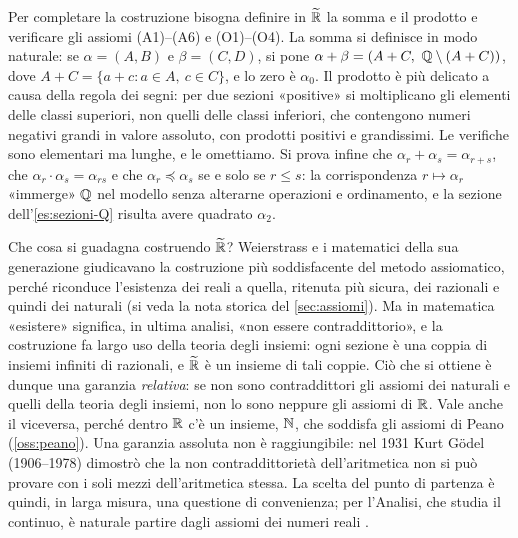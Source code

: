 \begin{osservazione}
Per completare la costruzione bisogna definire in $\widetilde{\mathbb{R}}$ la somma e il prodotto
e verificare gli assiomi (A1)--(A6) e (O1)--(O4). La somma si definisce in modo naturale:
se $\alpha=(A,B)$ e $\beta=(C,D)$, si pone $\alpha+\beta=(A+C,\ \Q\setminus(A+C))$, dove
$A+C=\{a+c : a\in A,\ c\in C\}$, e lo zero è $\alpha_{0}$. Il prodotto è più delicato a
causa della regola dei segni: per due sezioni «positive» si moltiplicano gli elementi
delle classi superiori, non quelli delle classi inferiori, che contengono numeri negativi
grandi in valore assoluto, con prodotti positivi e grandissimi. Le verifiche sono
elementari ma lunghe, e le omettiamo. Si prova infine che
$\alpha_{r}+\alpha_{s}=\alpha_{r+s}$, che $\alpha_{r}\cdot\alpha_{s}=\alpha_{rs}$ e che
$\alpha_{r}\preceq\alpha_{s}$ se e solo se $r\le s$: la corrispondenza $r\mapsto\alpha_{r}$
«immerge» $\mathbb{Q}$ nel modello senza alterarne operazioni e ordinamento, e la sezione
dell'\cref{es:sezioni-Q} risulta avere quadrato $\alpha_{2}$.
\end{osservazione}

\begin{osservazione}
Che cosa si guadagna costruendo $\widetilde{\mathbb{R}}$? Weierstrass e i matematici della sua
generazione giudicavano la costruzione più soddisfacente del metodo assiomatico, perché
riconduce l'esistenza dei reali a quella, ritenuta più sicura, dei razionali e quindi
dei naturali (si veda la nota storica del \cref{sec:assiomi}). Ma in matematica
«esistere» significa, in ultima analisi, «non essere contraddittorio», e la costruzione
fa largo uso della teoria degli insiemi: ogni sezione è una coppia di insiemi infiniti di
razionali, e $\widetilde{\mathbb{R}}$ è un insieme di tali coppie. Ciò che si ottiene è dunque una
garanzia \emph{relativa}: se non sono contraddittori gli assiomi dei naturali e quelli
della teoria degli insiemi, non lo sono neppure gli assiomi di $\mathbb{R}$. Vale anche il
viceversa, perché dentro $\mathbb{R}$ c'è un insieme, $\mathbb{N}$, che soddisfa gli assiomi di Peano
(\cref{oss:peano}). Una garanzia assoluta non è raggiungibile: nel 1931 Kurt Gödel
(1906--1978) dimostrò che la non contraddittorietà dell'aritmetica non si può provare con
i soli mezzi dell'aritmetica stessa. La scelta del punto di partenza è quindi, in larga
misura, una questione di convenienza; per l'Analisi, che studia il continuo, è naturale
partire dagli assiomi dei numeri reali \cite{giusti}.
\end{osservazione}

